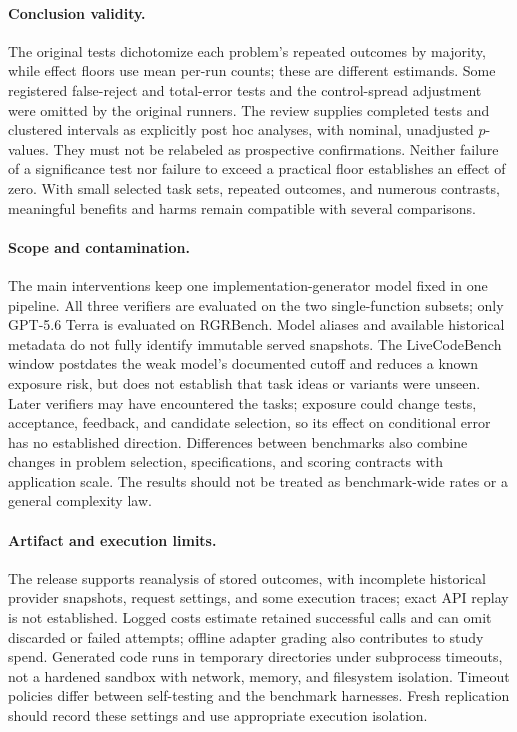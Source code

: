 \documentclass{article}
\begin{document}
\paragraph{Conclusion validity.} The original tests dichotomize each problem's repeated outcomes
by majority, while effect floors use mean per-run counts; these are different estimands. Some
registered false-reject and total-error tests and the control-spread adjustment were omitted by
the original runners. The review supplies completed tests and clustered intervals as explicitly
post hoc analyses, with nominal, unadjusted $p$-values. They must not be relabeled as prospective
confirmations. Neither failure of a significance test nor failure to exceed a practical floor
establishes an effect of zero. With small selected task sets, repeated outcomes, and numerous
contrasts, meaningful benefits and harms remain compatible with several comparisons.

\paragraph{Scope and contamination.} The main interventions keep one implementation-generator
model fixed in one pipeline. All three verifiers are evaluated on the two single-function
subsets; only GPT-5.6 Terra is evaluated on RGRBench. Model aliases and available historical
metadata do not fully identify immutable served snapshots. The LiveCodeBench window postdates
the weak model's documented cutoff and reduces a known exposure risk, but does not establish
that task ideas or variants were unseen. Later verifiers may have encountered the tasks;
exposure could change tests, acceptance, feedback, and candidate selection, so its effect on
conditional error has no established direction. Differences between benchmarks also combine
changes in problem selection, specifications, and scoring contracts with application scale.
The results should not be treated as benchmark-wide rates or a general complexity law.

\paragraph{Artifact and execution limits.} The release supports reanalysis of stored outcomes,
with incomplete historical provider snapshots, request settings, and some execution traces;
exact API replay is not established. Logged costs estimate retained successful calls and can
omit discarded or failed attempts; offline adapter grading also contributes to study spend.
Generated code runs in temporary directories under subprocess timeouts, not a hardened sandbox
with network, memory, and filesystem isolation. Timeout policies differ between self-testing
and the benchmark harnesses. Fresh replication should record these settings and use appropriate
execution isolation.
\end{document}
